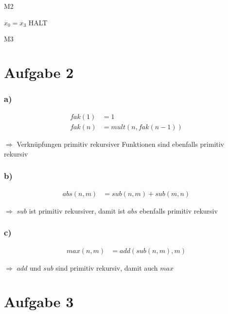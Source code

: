 \documentclass[a4paper,12pt]{article}
\begin{document}
	\begin{algorithm}[H]
		\caption{M2}
	\end{algorithm}

	\begin{algorithm}[H]
		$x_0 = x_3$\;
		HALT\;
		\caption{M3}
	\end{algorithm}
	\section*{Aufgabe 2}
	\subsubsection*{a)}
	\begin{align*}
		fak\left(1\right)& = 1\\
		fak\left(n\right)& = mult\left(n, fak\left(n-1\right)\right)
	\end{align*}
	\begin{center}
		$\Rightarrow$ Verknüpfungen primitiv rekursiver Funktionen sind ebenfalls primitiv rekursiv
	\end{center}

	\subsubsection*{b)}
	\begin{align*}
		abs\left(n,m\right)& = sub\left(n,m\right) + sub\left(m,n\right)
	\end{align*}
	\begin{center}
		$\Rightarrow$ $sub$ ist primitiv rekursiver, damit ist $abs$ ebenfalls primitiv rekursiv
	\end{center}
	\newpage
	\subsubsection*{c)}
	\begin{align*}
		max\left(n,m\right)& = add\left(sub\left(n,m\right),m\right)
	\end{align*}
	\begin{center}
		$\Rightarrow$ $add$ und $sub$ sind primitiv rekursiv, damit auch $max$
	\end{center}

	\section*{Aufgabe 3}
\end{document}

